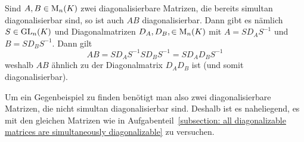 \begin{remark}
  Sind $A, B \in \operatorname{M}_{n}(K)$ zwei diagonalisierbare Matrizen, die bereits simultan diagonalisierbar sind, so ist auch $AB$ diagonalisierbar.
  Dann gibt es nämlich $S \in \operatorname{GL}_{n}(K)$ und Diagonalmatrizen $D_A, D_B, \in \operatorname{M}_{n}(K)$ mit $A = S D_A S^{-1}$ und $B = S D_B S^{-1}$.
  Dann gilt
  \[
      A B
    = S D_A S^{-1} S D_B S^{-1}
    = S D_A D_B S^{-1}
  \]
  weshalb $A B$ ähnlich zu der Diagonalmatrix $D_A D_B$ ist (und somit diagonalisierbar).
  
  Um ein Gegenbeispiel zu finden benötigt man also zwei diagonalisierbare Matrizen, die nicht simultan diagonalisierbar sind.
  Deshalb ist es naheliegend, es mit den gleichen Matrizen wie in Aufgabenteil~\ref{subsection: all diagonalizable matrices are simultaneously diagonalizable} zu versuchen.
  

\end{remark}
